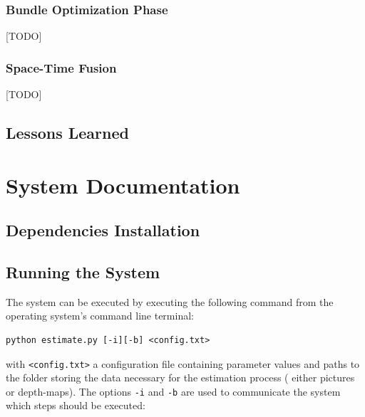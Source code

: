 \documentclass[notitlepage,english]{hgbreport}
\begin{document}
\subsection{Bundle Optimization Phase}
[TODO]
\subsection{Space-Time Fusion}
[TODO]


\section{Lessons Learned}




\chapter{System Documentation}
\newcommand{\ComputeEnergy}{\texttt{compute\_energy}}
\newcommand{\Estimate}{\texttt{estimate}}
\newcommand{\Lbp}{\texttt{lbp}}
\newcommand{\Utils}{\texttt{utils}}
\newcommand{\Params}{\texttt{params}}

\section{Dependencies Installation}

\section{Running the System}
The system can be executed by executing the following command from the operating system's command line terminal:
\begin{lstlisting}[stepnumber=0]
	python estimate.py [-i][-b] <config.txt>
\end{lstlisting}
with \texttt{<config.txt>} a configuration file containing parameter values and paths to the folder storing the data necessary for the estimation process (\ie{} either pictures or depth-maps).
The options \texttt{-i} and \texttt{-b} are used to communicate the system which steps should be executed:
\end{document}
